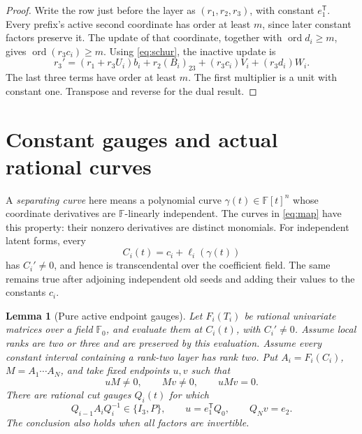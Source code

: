 \documentclass[11pt]{article}
\newtheorem{lemma}[theorem]{Lemma}
\newcommand{\F}{\mathbb F}
\newcommand{\ord}{\operatorname{ord}}
\begin{document}
\begin{proof}
Write the row just before the layer as \((r_1,r_2,r_3)\), with constant
\(e_1^{\mathsf T}\). Every prefix's active second coordinate has order
at least \(m\), since later constant factors preserve it. The update
of that coordinate, together with \(\ord d_i\ge m\), gives
\(\ord(r_3c_i)\ge m\). Using \eqref{eq:schur}, the inactive update is
\[
 r_3'=(r_1+r_3U_i)b_i+r_2(B_i)_{23}
                 +(r_3c_i)V_i+(r_3d_i)W_i.
\]
The last three terms have order at least \(m\). The first multiplier
is a unit with constant one. Transpose and reverse for the dual result.
\end{proof}

\section{Constant gauges and actual rational curves}

A \emph{separating curve} here means a polynomial curve
\(\gamma(t)\in\F[t]^n\) whose coordinate derivatives are
\(\F\)-linearly independent. The curves in \eqref{eq:map} have this
property: their nonzero derivatives are distinct monomials.
For independent latent forms, every
\[
 C_i(t)=c_i+\ell_i(\gamma(t))
\]
has \(C_i'\ne0\), and hence is transcendental over the coefficient
field. The same remains true after adjoining independent old seeds
and adding their values to the constants \(c_i\).

\begin{lemma}[Pure active endpoint gauges]\label{lem:gauges}
Let \(F_i(T_i)\) be rational univariate matrices over a field \(\F_0\),
and evaluate them at \(C_i(t)\), with \(C_i'\ne0\). Assume local ranks
are two or three and are preserved by this evaluation. Assume every
constant interval containing a rank-two layer has rank two. Put
\(A_i=F_i(C_i)\), \(M=A_1\cdots A_N\), and take fixed endpoints \(u,v\)
such that
\[
 uM\ne0,\qquad Mv\ne0,\qquad uMv=0.
\]
There are rational cut gauges \(Q_i(t)\) for which
\[
 Q_{i-1}A_iQ_i^{-1}\in\{I_3,P\},\qquad
 u=e_1^{\mathsf T}Q_0,\qquad Q_Nv=e_2.
\]
The conclusion also holds when all factors are invertible.
\end{lemma}
\end{document}

